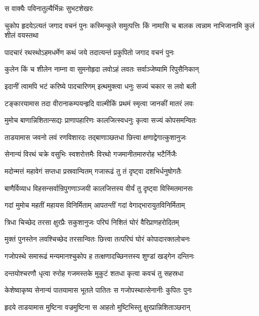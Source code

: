 

\onelineshloka
{स वाक्यैः पविनातुल्यैर्भिन्नः सुभटशेखरः}%


\threelineshloka
{चुकोप हृदयेऽत्यतं जगाद वचनं पुनः}
{कस्मिन्कुले समुत्पत्तिः किं नामासि च बालक}
{त्वन्नाम नाभिजानामि कुलं शीलं वयस्तथा}%

\twolineshloka
{पादचारं रथस्थोऽहमधर्मेण कथं जये}
{तदात्यन्तं प्रकुपितो जगाद वचनं पुनः}%

\twolineshloka
{कुलेन किं च शीलेन नाम्ना वा सुमनोहृदा}
{लवोऽहं लवतः सर्वाञ्जेष्यामि रिपुसैनिकान्}%

\twolineshloka
{इदानीं त्वामपि भटं करिष्ये पादचारिणम्}
{इत्थमुक्त्वा धनुः सज्यं चकार स लवो बली}%

\twolineshloka
{टङ्कारयामास तदा वीरानाकम्पयन्हृदि}
{वाल्मीकिं प्रथमं स्मृत्वा जानकीं मातरं लवः}%

\twolineshloka
{मुमोच बाणान्निशितान्सद्यः प्राणापहारिणः}
{कालजित्स्वधनुः कृत्वा सज्यं कोपसमन्वितः}%

\twolineshloka
{ताडयामास जवनो लवं रणविशारदः}
{तद्बाणाञ्छतधा छित्त्वा क्षणाद्वेगात्कुशानुजः}%

\twolineshloka
{सेनान्यं विरथं चक्रे वसुभिः स्वशरोत्तमैः}
{विरथो गजमानीतमारुरोह भटैर्निजैः}%

\twolineshloka
{मदोन्मत्तं महावेगं सप्तधा प्रस्रवान्वितम्}
{गजारूढं तु तं दृष्ट्वा दशभिर्धनुषोगतैः}%

\twolineshloka
{बाणैर्विव्याध विहसन्सर्वान्रिपुगणाञ्जयी}
{कालजित्तस्य वीर्यं तु दृष्ट्वा विस्मितमानसः}%

\twolineshloka
{गदां मुमोच महतीं महायस विनिर्मिताम्}
{आपतन्तीं गदां वेगाद्भारायुतविनिर्मिताम्}%

\twolineshloka
{त्रिधा चिच्छेद तरसा क्षुरप्रैः सकुशानुजः}
{परिघं निशितं घोरं वैरिप्राणहरोदितम्}%

\twolineshloka
{मुक्तं पुनस्तेन लवश्चिच्छेद तरसान्वितः}
{छित्त्वा तत्परिघं घोरं कोपादारक्तलोचनः}%

\twolineshloka
{गजोपस्थे समारूढं मन्यमानश्चुकोप ह}
{तत्क्षणादच्छिनत्तस्य शुण्डां खड्गेन दन्तिनः}%

\twolineshloka
{दन्तयोश्चरणौ धृत्वा रुरोह गजमस्तके}
{मुकुटं शतधा कृत्वा कवचं तु सहस्रधा}%

\twolineshloka
{केशेष्वाकृष्य सेनान्यं पातयामास भूतले}
{पातितः स गजोपस्थात्सेनानीः कुपितः पुनः}%

\twolineshloka
{हृदये ताडयामास मुष्टिना वज्रमुष्टिना}
{स आहतो मुष्टिभिस्तु क्षुरप्रान्निशिताञ्छरान्}%


